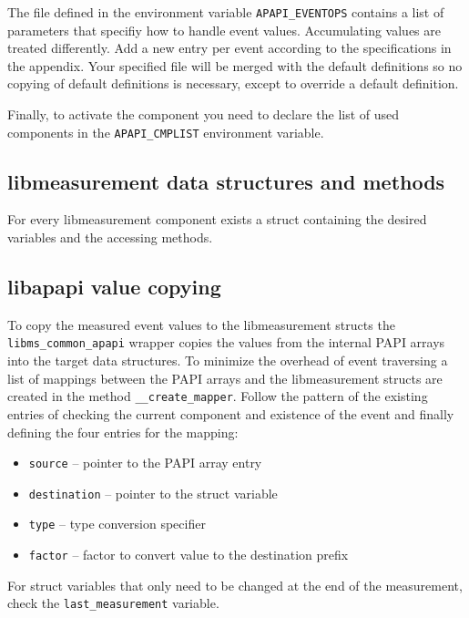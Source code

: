 The file defined in the environment variable \verb+APAPI_EVENTOPS+ contains a list of parameters that specifiy how to handle event values.
Accumulating values are treated differently.
Add a new entry per event according to the specifications in the appendix.
Your specified file will be merged with the default definitions so no copying of default definitions is necessary, except to override a default definition.

Finally, to activate the component you need to declare the list of used components in the \verb+APAPI_CMPLIST+ environment variable.

\subsection{libmeasurement data structures and methods}

For every libmeasurement component exists a struct containing the desired variables and the accessing methods.

\subsection{libapapi value copying}

To copy the measured event values to the libmeasurement structs the \verb+libms_common_apapi+ wrapper copies the values from the internal PAPI arrays into the target data structures.
To minimize the overhead of event traversing a list of mappings between the PAPI arrays and the libmeasurement structs are created in the method \verb+__create_mapper+.
Follow the pattern of the existing entries of checking the current component and existence of the event and finally defining the four entries for the mapping:

\begin{itemize}
\item \verb+source+ -- pointer to the PAPI array entry
\item \verb+destination+ -- pointer to the struct variable
\item \verb+type+ -- type conversion specifier
\item \verb+factor+ -- factor to convert value to the destination prefix
\end{itemize}

For struct variables that only need to be changed at the end of the measurement, check the \verb+last_measurement+ variable.

